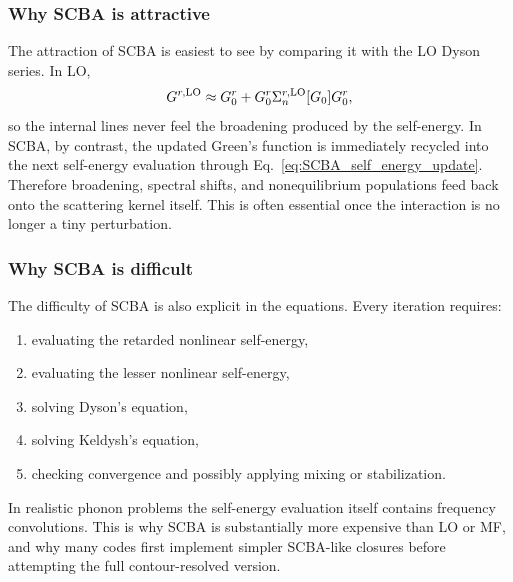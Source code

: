 \subsubsection{Why SCBA is attractive}
The attraction of SCBA is easiest to see by comparing it with the LO Dyson series. In LO,
\begin{equation}
    G^{r,\rm LO} \approx G_0^r + G_0^r\Sigma_n^{r,\rm LO}[G_0]G_0^r,
\end{equation}
so the internal lines never feel the broadening produced by the self-energy. In SCBA, by contrast, the updated Green's function is immediately recycled into the next self-energy evaluation through Eq.~\eqref{eq:SCBA_self_energy_update}. Therefore broadening, spectral shifts, and nonequilibrium populations feed back onto the scattering kernel itself. This is often essential once the interaction is no longer a tiny perturbation.

\subsubsection{Why SCBA is difficult}
The difficulty of SCBA is also explicit in the equations. Every iteration requires:
\begin{enumerate}[label=\arabic*.]
\item evaluating the retarded nonlinear self-energy,
\item evaluating the lesser nonlinear self-energy,
\item solving Dyson's equation,
\item solving Keldysh's equation,
\item checking convergence and possibly applying mixing or stabilization.
\end{enumerate}
In realistic phonon problems the self-energy evaluation itself contains frequency convolutions. This is why SCBA is substantially more expensive than LO or MF, and why many codes first implement simpler SCBA-like closures before attempting the full contour-resolved version.

